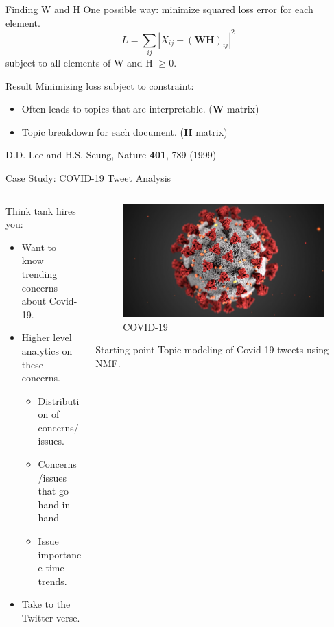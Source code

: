 \documentclass{beamer}
\begin{document}
\begin{frame}{Finding W and H}
	One possible way: minimize squared loss error for each element.
	$$ L = \sum_{ij}|X_{ij} - (\textbf{W}\textbf{H})_{ij}|^2 $$
	subject to all elements of W and H $\geq 0$.
	\begin{block}{Result}
		Minimizing loss subject to constraint:
		\begin{itemize}
			\item Often leads to topics that are interpretable. (\textbf{W} matrix) 
			\item Topic breakdown for each document. (\textbf{H} matrix) 
		\end{itemize}
	\end{block}

D.D. Lee and H.S. Seung, Nature \textbf{401}, 789 (1999)
\end{frame}
\begin{frame}{Case Study: COVID-19 Tweet Analysis}
\begin{columns}
\begin{column}{0.5\textwidth}
Think tank hires you:
\begin{itemize}
	\item Want to know trending concerns about Covid-19.
	\item Higher level analytics on these concerns.
	\begin{itemize}
		\item Distribution of concerns/issues.
		\item Concerns/issues that go hand-in-hand
		\item Issue importance time trends.
	\end{itemize} 
\item Take to the Twitter-verse.
\end{itemize}
\end{column}
\begin{column}{0.5\textwidth}
\begin{figure}
	\includegraphics[scale=0.09]{covid19}
	\caption{COVID-19}
\end{figure}
\begin{block}{Starting point}
	Topic modeling of Covid-19 tweets using NMF.
\end{block}
\end{column}
\end{columns}
\end{frame}
\end{document}
